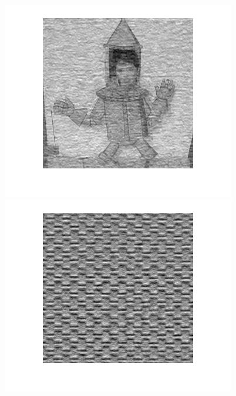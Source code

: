 \begin{figure}
{\begin{minipage}[b]{0.23\linewidth}
\includegraphics[width=1\linewidth]{images/MCA_Cartoon.png}\vspace{4pt}
\includegraphics[width=1\linewidth]{images/MCA_Texture.png}
\end{minipage}}
\end{figure}
